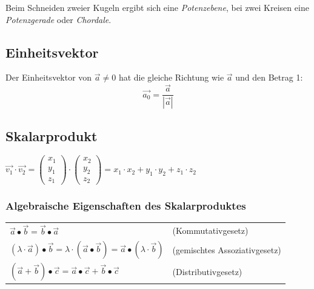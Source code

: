 		Beim Schneiden zweier Kugeln ergibt sich eine \textit{Potenzebene}, bei zwei Kreisen eine
		\textit{Potenzgerade} oder \textit{Chordale}.



\subsection{Einheitsvektor}
	Der Einheitsvektor von $\vec{a} \neq 0$ hat die gleiche Richtung wie $\vec{a}$ und den Betrag 1:
	\begin{equation*}
		\vec{a_0} = \frac{\vec{a}}{|\vec{a}|}
	\end{equation*}

\subsection{Skalarprodukt}
	$\vec{v_1} \cdot \vec{v_2} = \left(\begin{array}{c} x_1 \\ y_1 \\ z_1 \end{array}\right) \cdot \left(\begin{array}{c} x_2 \\ y_2 \\ z_2 \end{array}\right)
	= x_1\cdot x_2 + y_1\cdot y_2 + z_1\cdot z_2$
	
	\subsubsection{Algebraische Eigenschaften des Skalarproduktes}
		\begin{tabular}{ll}
			$\vec{a} \bullet \vec{b} = \vec{b} \bullet \vec{a}$ & (Kommutativgesetz)\\
			$(\lambda \cdot \vec{a}) \bullet \vec{b} = \lambda \cdot (\vec{a} \bullet \vec{b}) = \vec{a} \bullet (\lambda \cdot \vec{b})$ & (gemischtes Assoziativgesetz)\\
			$(\vec{a} + \vec{b}) \bullet \vec{c} = \vec{a} \bullet \vec{c} + \vec{b} \bullet \vec{c}$ & (Distributivgesetz)
		\end{tabular}


